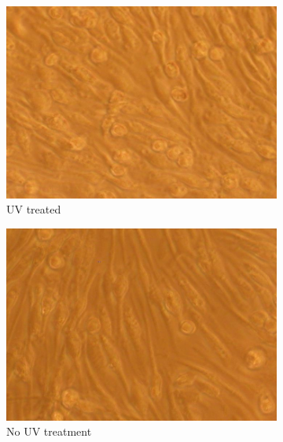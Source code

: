 \documentclass[fleqn,10pt]{wlpeerj}
\begin{document}
\begin{figure}
    \centering
    \begin{subfigure}[b]{0.24\textwidth}
        \centering
        \includegraphics[width=\textwidth]{Fig3a}
        \caption{UV treated}
        \label{fig:mouse_uv}
    \end{subfigure}
    \hfill
    \begin{subfigure}[b]{0.24\textwidth}
        \centering
        \includegraphics[width=\textwidth]{Fig3b}
        \caption{No UV treatment}
        \label{fig:mouse_nouv}
    \end{subfigure}
    \hfill
    \begin{subfigure}[b]{0.24\textwidth}
        \centering

\end{subfigure}
\end{figure}
\end{document}
